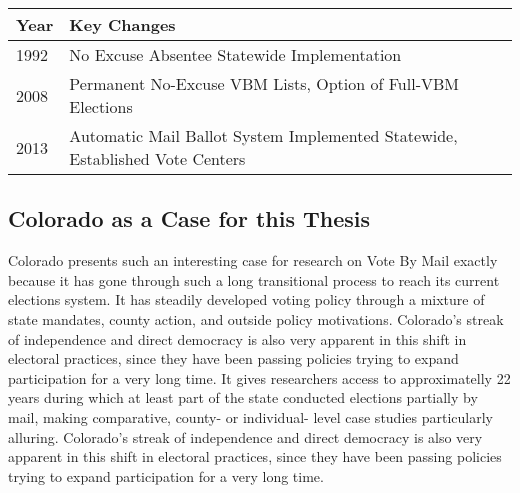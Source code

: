 \documentclass[12pt,twoside]{reedthesis}
\begin{document}
  \begin{longtable}[]{@{}ll@{}}
  \toprule
  \begin{minipage}[b]{0.05\columnwidth}\raggedright\strut
  Year\strut
  \end{minipage} & \begin{minipage}[b]{0.89\columnwidth}\raggedright\strut
  Key Changes\strut
  \end{minipage}\tabularnewline
  \midrule
  \endhead
  \begin{minipage}[t]{0.05\columnwidth}\raggedright\strut
  1992\strut
  \end{minipage} & \begin{minipage}[t]{0.89\columnwidth}\raggedright\strut
  No Excuse Absentee Statewide Implementation\strut
  \end{minipage}\tabularnewline
  \begin{minipage}[t]{0.05\columnwidth}\raggedright\strut
  2008\strut
  \end{minipage} & \begin{minipage}[t]{0.89\columnwidth}\raggedright\strut
  Permanent No-Excuse VBM Lists, Option of Full-VBM Elections\strut
  \end{minipage}\tabularnewline
  \begin{minipage}[t]{0.05\columnwidth}\raggedright\strut
  2013\strut
  \end{minipage} & \begin{minipage}[t]{0.89\columnwidth}\raggedright\strut
  Automatic Mail Ballot System Implemented Statewide, Established Vote
  Centers\strut
  \end{minipage}\tabularnewline
  \bottomrule
  \end{longtable}
  
  \subsection{Colorado as a Case for this
  Thesis}\label{colorado-as-a-case-for-this-thesis}
  
  Colorado presents such an interesting case for research on Vote By Mail
  exactly because it has gone through such a long transitional process to
  reach its current elections system. It has steadily developed voting
  policy through a mixture of state mandates, county action, and outside
  policy motivations. Colorado's streak of independence and direct
  democracy is also very apparent in this shift in electoral practices,
  since they have been passing policies trying to expand participation for
  a very long time. It gives researchers access to approximatelly 22 years
  during which at least part of the state conducted elections partially by
  mail, making comparative, county- or individual- level case studies
  particularly alluring. Colorado's streak of independence and direct
  democracy is also very apparent in this shift in electoral practices,
  since they have been passing policies trying to expand participation for
  a very long time.
  
\end{document}
